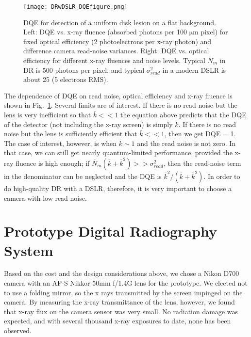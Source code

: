 \begin{figure}
\centering
\texttt{[image: DRwDSLR\_DQEfigure.png]}
\caption{DQE for detection of a uniform disk lesion on a flat background. Left: DQE vs. x-ray fluence (absorbed photons per 100 $\mathrm{\mu m}$ pixel) for fixed optical efficiency (2 photoelectrons per x-ray photon) and difference camera read-noise variances. Right: DQE vs. optical efficiency for different x-ray fluences and noise levels. Typical $\overline{N}_m$ in DR is 500 photons per pixel, and typical $\sigma_{read}^2$ in a modern DSLR is about 25 (5 electrons RMS).}
\label{fig:DQE}
\end{figure}

The dependence of DQE on read noise, optical efficiency and x-ray fluence is shown in Fig.~\ref{fig:DQE}. Several limits are of interest. If there is no read noise but the lens is very inefficient so that $\bar{k} << 1$ the equation above predicts that the DQE of the detector (not including the x-ray screen) is simply $\bar{k}$.  If there is no read noise but the lens is sufficiently efficient that $\bar{k} << 1$, then we get DQE = 1. The case of interest, however, is when $\bar{k} \sim 1$ and the read noise is not zero. In that case, we can still get nearly quantum-limited performance, provided the x-ray fluence is high enough; if $\overline{N}_m(\bar{k}+\bar{k}^2) >> \sigma_{read}^2$, then the read-noise term in the denominator can be neglected and the DQE is $\bar{k}^2/(\bar{k}+\bar{k}^2)$. In order to do high-quality DR with a DSLR, therefore, it is very important to choose a camera with low read noise.

\section{Prototype Digital Radiography System}
Based on the cost and the design considerations above, we chose a Nikon D700 camera with an AF-S Nikkor 50mm f/1.4G lens for the prototype.  We elected not to use a folding mirror, so the x rays transmitted by the screen impinged on the camera. By measuring the x-ray transmittance of the lens, however, we found that x-ray flux on the camera sensor was very small. No radiation damage was expected, and with several thousand x-ray exposures to date, none has been observed.

